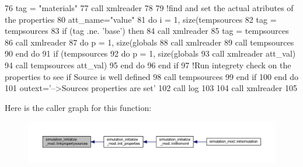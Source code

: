 \begin{DoxyCode}
76     tag = \textcolor{stringliteral}{"materials"}
77     \textcolor{keyword}{call }xmlreader%
78 
79     \textcolor{comment}{!find and set the actual atributes of the properties}
80     att\_name=\textcolor{stringliteral}{"value"}
81     \textcolor{keywordflow}{do} i = 1, \textcolor{keyword}{size}(tempsources%
82         tag = tempsources%
83         \textcolor{keywordflow}{if} (tag .ne. \textcolor{stringliteral}{'base'}) \textcolor{keywordflow}{then}
84             \textcolor{keyword}{call }xmlreader%
85             tag = tempsources%
86             \textcolor{keyword}{call }xmlreader%
87             \textcolor{keywordflow}{do} p = 1, \textcolor{keyword}{size}(globals%
88                 \textcolor{keyword}{call }xmlreader%
89                 \textcolor{keyword}{call }tempsources%
90 \textcolor{keywordflow}{            end do}
91             \textcolor{keywordflow}{if} (tempsources%
92                 \textcolor{keywordflow}{do} p = 1, \textcolor{keyword}{size}(globals%
93                     \textcolor{keyword}{call }xmlreader%
      att\_val)
94                     \textcolor{keyword}{call }tempsources%
      att\_val)
95 \textcolor{keywordflow}{                end do}
96 \textcolor{keywordflow}{            end if}
97             \textcolor{comment}{!Run integrety check on the properties to see if Source is well defined}
98             \textcolor{keyword}{call }tempsources%
99 \textcolor{keywordflow}{        end if}
100 \textcolor{keywordflow}{    end do}
101     outext=\textcolor{stringliteral}{'-->Sources properties are set'}
102     \textcolor{keyword}{call }log%
103 
104     \textcolor{keyword}{call }xmlreader%
105 
\end{DoxyCode}
Here is the caller graph for this function\+:\nopagebreak
\begin{figure}[H]
\begin{center}
\leavevmode
\includegraphics[width=350pt]{namespacesimulation__initialize__mod_a695ed61242e902d50bc40b83a6d11f65_icgraph}
\end{center}
\end{figure}
